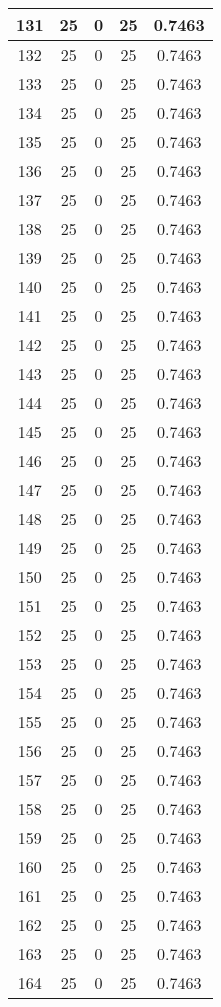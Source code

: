 \documentclass[letterpaper, 12pt]{article}
\begin{document}
\begin{longtable}{|c|c|c|c|c|}
\hline
131 & 25 & 0 & 25 & 0.7463 \\
\hline
132 & 25 & 0 & 25 & 0.7463 \\
\hline
133 & 25 & 0 & 25 & 0.7463 \\
\hline
134 & 25 & 0 & 25 & 0.7463 \\
\hline
135 & 25 & 0 & 25 & 0.7463 \\
\hline
136 & 25 & 0 & 25 & 0.7463 \\
\hline
137 & 25 & 0 & 25 & 0.7463 \\
\hline
138 & 25 & 0 & 25 & 0.7463 \\
\hline
139 & 25 & 0 & 25 & 0.7463 \\
\hline
140 & 25 & 0 & 25 & 0.7463 \\
\hline
141 & 25 & 0 & 25 & 0.7463 \\
\hline
142 & 25 & 0 & 25 & 0.7463 \\
\hline
143 & 25 & 0 & 25 & 0.7463 \\
\hline
144 & 25 & 0 & 25 & 0.7463 \\
\hline
145 & 25 & 0 & 25 & 0.7463 \\
\hline
146 & 25 & 0 & 25 & 0.7463 \\
\hline
147 & 25 & 0 & 25 & 0.7463 \\
\hline
148 & 25 & 0 & 25 & 0.7463 \\
\hline
149 & 25 & 0 & 25 & 0.7463 \\
\hline
150 & 25 & 0 & 25 & 0.7463 \\
\hline
151 & 25 & 0 & 25 & 0.7463 \\
\hline
152 & 25 & 0 & 25 & 0.7463 \\
\hline
153 & 25 & 0 & 25 & 0.7463 \\
\hline
154 & 25 & 0 & 25 & 0.7463 \\
\hline
155 & 25 & 0 & 25 & 0.7463 \\
\hline
156 & 25 & 0 & 25 & 0.7463 \\
\hline
157 & 25 & 0 & 25 & 0.7463 \\
\hline
158 & 25 & 0 & 25 & 0.7463 \\
\hline
159 & 25 & 0 & 25 & 0.7463 \\
\hline
160 & 25 & 0 & 25 & 0.7463 \\
\hline
161 & 25 & 0 & 25 & 0.7463 \\
\hline
162 & 25 & 0 & 25 & 0.7463 \\
\hline
163 & 25 & 0 & 25 & 0.7463 \\
\hline
164 & 25 & 0 & 25 & 0.7463 \\

\end{longtable}
\end{document}
